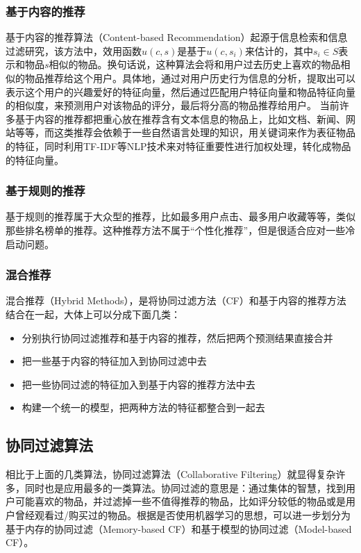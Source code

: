 \documentclass{article}
\begin{document}
		\subsubsection{基于内容的推荐}
		基于内容的推荐算法（Content-based Recommendation）起源于信息检索和信息过滤研究，该方法中，效用函数$u(c,s)$是基于$u(c,s_i)$来估计的，其中$s_i\in S$表示和物品$s$相似的物品。换句话说，这种算法会将和用户过去历史上喜欢的物品相似的物品推荐给这个用户。具体地，通过对用户历史行为信息的分析，提取出可以表示这个用户的兴趣爱好的特征向量，然后通过匹配用户特征向量和物品特征向量的相似度，来预测用户对该物品的评分，最后将分高的物品推荐给用户。
		当前许多基于内容的推荐都把重心放在推荐含有文本信息的物品上，比如文档、新闻、网站等等，而这类推荐会依赖于一些自然语言处理的知识，用关键词来作为表征物品的特征，同时利用TF-IDF等NLP技术来对特征重要性进行加权处理，转化成物品的特征向量。
		\subsubsection{基于规则的推荐}
		基于规则的推荐属于大众型的推荐，比如最多用户点击、最多用户收藏等等，类似那些排名榜单的推荐。这种推荐方法不属于“个性化推荐”，但是很适合应对一些冷启动问题。
		\subsubsection{混合推荐}
		混合推荐（Hybrid Methods），是将协同过滤方法（CF）和基于内容的推荐方法结合在一起，大体上可以分成下面几类：
		\begin{itemize}
			\item 分别执行协同过滤推荐和基于内容的推荐，然后把两个预测结果直接合并
			\item 把一些基于内容的特征加入到协同过滤中去
			\item 把一些协同过滤的特征加入到基于内容的推荐方法中去
			\item 构建一个统一的模型，把两种方法的特征都整合到一起去
		\end{itemize}
	\subsection{协同过滤算法}
	相比于上面的几类算法，协同过滤算法（Collaborative Filtering）就显得复杂许多，同时也是应用最多的一类算法。协同过滤的意思是：通过集体的智慧，找到用户可能喜欢的物品，并过滤掉一些不值得推荐的物品，比如评分较低的物品或是用户曾经观看过/购买过的物品。根据是否使用机器学习的思想，可以进一步划分为基于内存的协同过滤（Memory-based CF）和基于模型的协同过滤（Model-based CF）。
\end{document}
